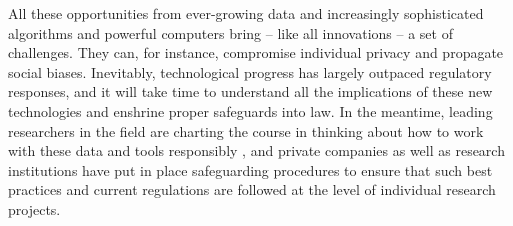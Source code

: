 All these opportunities from ever-growing data and increasingly sophisticated
algorithms and powerful computers bring -- like all innovations -- a set of
challenges. They can, for instance, compromise individual privacy and propagate
social biases. Inevitably, technological progress has largely outpaced
regulatory responses, and it will take time to understand all the implications
of these new technologies and enshrine proper safeguards into law. In the
meantime, leading researchers in the field are charting the course in thinking
about how to work with these data and tools responsibly
\citep{demontjoye2015unique, kosinski2015facebook, blumenstock2018don}, and
private companies as well as research institutions have put in place
safeguarding procedures to ensure that such best practices and current
regulations are followed at the level of individual research projects.

